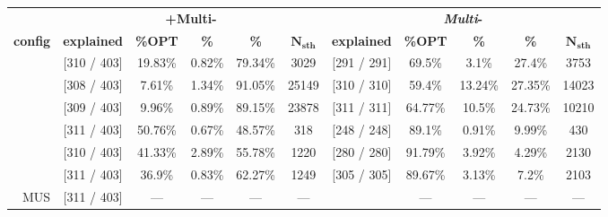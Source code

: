 
\begin{landscape}
	\vspace*{\fill}
	\thispagestyle{empty}
	\begin{table}[!h]
		\centering
			\begin{tabular}{r|c|c|c|c|c|c|c|c|c|c}
				& \multicolumn{5}{c|}{\textbf{\maxsat+Multi-\sat}} & \multicolumn{5}{c}{\textbf{\emph{Multi}-\subsetmaxsat}}\\[1ex]
				\textbf{config}          & \textbf{explained}  &  \textbf{\%\textsc{OPT}} &   \textbf{\%\sat} & \textbf{\%\corrss} &  $\mathbf{N_{sth}}$   & \textbf{explained}  &  \textbf{\%\textsc{OPT}} &   \textbf{\%\sat} & \textbf{\%\corrss} &  $\mathbf{N_{sth}}$  \\ \midrule 
				\comus                  & [310 / 403] &         19.83\% &   0.82\% &    79.34\% &      3029     &  [291 / 291] &  69.5\% &   3.1\% &  27.4\% & 3753  \\ 
				\comusbound             & [308 / 403] &          7.61\% &   1.34\% &    91.05\% &     25149     &  [310 / 310] &  59.4\% & 13.24\% & 27.35\% & 14023  \\ 
				\ousbiter               & [309 / 403] &          9.96\% &   0.89\% &    89.15\% &     23878     &  [311 / 311] & 64.77\% &  10.5\% & 24.73\% & 10210  \\ \hline
				\comusincr              & [311 / 403] &         50.76\% &   0.67\% &    48.57\% &       318     &  [248 / 248] &  89.1\% &  0.91\% &  9.99\% & 430  \\ 
				\ousbincr  		        & [310 / 403] &         41.33\% &   2.89\% &    55.78\% &      1220     &  [280 / 280] & 91.79\% &  3.92\% &  4.29\% & 2130  \\ 
				\ousbiterincr           & [311 / 403] &          36.9\% &   0.83\% &    62.27\% &      1249     &  [305 / 305] & 89.67\% &  3.13\% &   7.2\% & 2103  \\  \hline
				MUS                     & [311 / 403] &             --- &       ---&          ---&        ---   &  &             --- &       ---&          ---&        --- \\ 
			\end{tabular}

\end{table}
\end{landscape}
